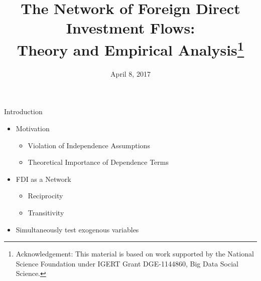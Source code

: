\documentclass{beamer}
\title[The Network of FDI Flows]{The Network of Foreign Direct Investment Flows:\\Theory and Empirical Analysis\thanks{\scriptsize {Acknowledgement: This material is based on work supported by the National Science Foundation under IGERT Grant DGE-1144860, Big Data Social Science.}}}
\author[Schoeneman, Zhu, \& Desmarais]{%
  \texorpdfstring{%
    \begin{columns}
      \column{.3\linewidth}
      \centering
      John Schoeneman{\thanks{\scriptsize{Pennsylvania State University}}} \\ \scriptsize{jbs5686@psu.edu\\ PhD Candidate}
      \column{.3\linewidth}
      \centering
      Boliang Zhu{\samethanks[2]} \\ \scriptsize{bxz14@psu.edu\\ Assistant Professor}
    \end{columns}
    \vspace{12pt}
    \begin{columns}
      \column{.3\linewidth}
      \centering
      Bruce Desmarais{\samethanks[2]}\\ \scriptsize{bdesmarais@psu.edu\\ Associate Professor}
    \end{columns}
 }
 {Author 1, Author 2, Author 3}
}
\date{April 8, 2017}
\begin{document}
\begin{frame}
  \titlepage
\end{frame}




\begin{frame}{Introduction}


\begin{itemize}
 \item{Motivation}
 \begin{itemize}
\item{Violation of Independence Assumptions}
\item{Theoretical Importance of Dependence Terms}
 \end{itemize}
\item{FDI as a Network}
\begin{itemize}
\item{Reciprocity}
\item{Transitivity}
 \end{itemize}

  \item{Simultaneously test exogenous variables}
 \end{itemize}



\end{frame}
\end{document}
